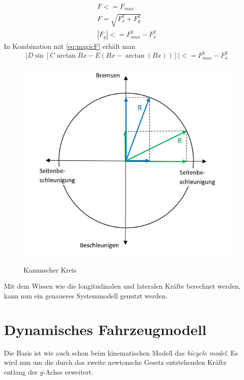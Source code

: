 \documentclass{like}
\begin{document}
\begin{eqnarray}
	F <= F_{max} \\
	F = \sqrt{F_x^2 + F_y^2}  \\
	|F_y| <= F_{max}^2 - F_x^2
\end{eqnarray}
In Kombination mit \ref{eq:magicF} erhält man
 \begin{equation}
	|D\sin[C\arctan{Bx - E(Bx - \arctan(Bx))}]| <= F_{max}^2 - F_x^2
 \end{equation}

\begin{figure}[ht!]
	\caption{Kammscher Kreis}
	\includegraphics[width=400pt]{Abbildungen/kamKreis.jpg}
	\label{fig:kamKreis}
\end{figure}
	
	



Mit dem Wissen wie die longitudinalen und lateralen Kräfte berechnet werden, kann nun ein genaueres Systemmodell genutzt werden.

\section{Dynamisches Fahrzeugmodell}
\label{dynModel}

Die Basis ist wie auch schon beim kinematischen Modell das \textit{bicycle model}. Es wird nun um die durch das zweite newtonsche Gesetz entstehenden Kräfte entlang der \(y\)-Achse erweitert.
\end{document}
